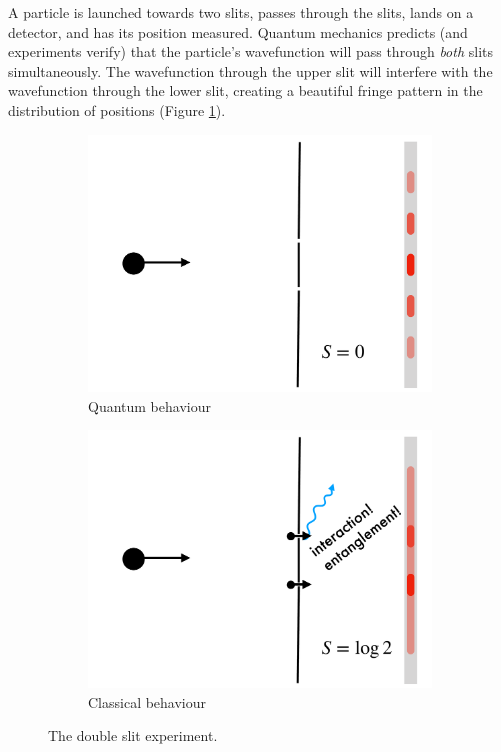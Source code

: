 A particle is launched towards two slits, passes through the slits, lands on a detector, and has its position measured. Quantum mechanics predicts (and experiments verify) that the particle’s wavefunction will pass through \emph{both} slits simultaneously. The wavefunction through the upper slit will interfere with the wavefunction through the lower slit, creating a beautiful fringe pattern in the distribution of positions (Figure \ref{fig.quantum}).

\begin{figure}[bt]
\begin{subfigure}[t]{0.48\textwidth}
    \centering
    \begin{framed}
    \centering
    \includegraphics[width=\linewidth]{Figures/quantum}
    \caption{Quantum behaviour}
    \label{fig.quantum}
    \end{framed}
\end{subfigure}
\hfill
\begin{subfigure}[t]{0.48\textwidth}
    \centering
    \begin{framed}
    \centering
    \includegraphics[width=\linewidth]{Figures/classical}
    \caption{Classical behaviour}
    \label{fig.classical}
    \end{framed}
\end{subfigure}
\caption{The double slit experiment.\label{fig.universeparts}}
\end{figure}

